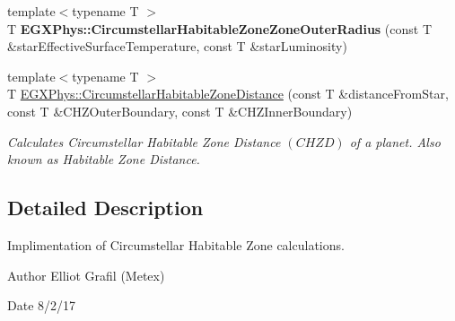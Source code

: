 \begin{DoxyCompactItemize}
\mbox{\label{_circumstellar_habitable_zone_8inl_ac6f89712c52ce26e1e2085fd85a914ea}} 
{\footnotesize template$<$typename T $>$ }\\T {\bfseries E\+G\+X\+Phys\+::\+Circumstellar\+Habitable\+Zone\+Zone\+Outer\+Radius} (const T \&star\+Effective\+Surface\+Temperature, const T \&star\+Luminosity)
\item 
{\footnotesize template$<$typename T $>$ }\\T \mbox{\hyperlink{group___e_g_x_phys-_circumstellar_habitable_zone_limit_gacf3a720793cdb27f6d93b170b44e81be}{E\+G\+X\+Phys\+::\+Circumstellar\+Habitable\+Zone\+Distance}} (const T \&distance\+From\+Star, const T \&C\+H\+Z\+Outer\+Boundary, const T \&C\+H\+Z\+Inner\+Boundary)
\begin{DoxyCompactList}\small\item\em Calculates Circumstellar Habitable Zone Distance $(CHZD)$ of a planet. Also known as Habitable Zone Distance. \end{DoxyCompactList}\end{DoxyCompactItemize}


\subsection{Detailed Description}
Implimentation of Circumstellar Habitable Zone calculations. 

\begin{DoxyAuthor}{Author}
Elliot Grafil (Metex) 
\end{DoxyAuthor}
\begin{DoxyDate}{Date}
8/2/17 
\end{DoxyDate}
